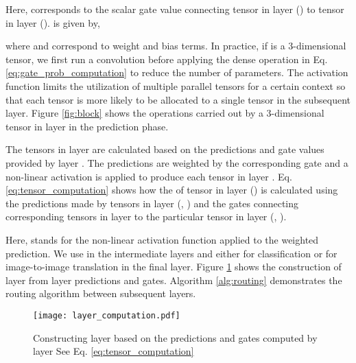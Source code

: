 \documentclass[10pt,twocolumn,letterpaper]{article}
\begin{document}
Here,  corresponds to the scalar gate value connecting  tensor in  layer () to   tensor in layer  ().  is given by,
\vspace{-0.1in}


where  and  correspond to weight and bias terms.
In practice, if  is a 3-dimensional tensor, we first run a  convolution before applying the dense operation in Eq. \ref{eq:gate_prob_computation} to reduce the number of parameters. The activation function  limits the utilization of multiple parallel tensors for a certain context so that each tensor is more likely to be allocated to a single tensor in the subsequent layer. Figure \ref{fig:block} shows the operations carried out by a 3-dimensional tensor in layer  in the prediction phase.




The tensors in layer  are calculated based on the predictions and gate values provided by layer . The predictions are weighted by the corresponding gate and a non-linear activation is applied to produce each tensor in layer .
Eq. \ref{eq:tensor_computation} shows how the of tensor  in layer  () is calculated using the predictions made by tensors in layer  (, ) and the gates connecting corresponding tensors in layer  to the particular tensor in layer  (, ).
\vspace{-0.1in}


Here,  stands for the non-linear activation function applied to the weighted prediction. We use  in the intermediate layers and either  for classification or  for image-to-image translation in the final layer. Figure \ref{fig:routing} shows the construction of layer  from layer  predictions and gates.
Algorithm \ref{alg:routing} demonstrates the routing algorithm between subsequent layers.



\begin{figure}[t]
	\begin{center}
		\texttt{[image: layer\_computation.pdf]}
	\end{center}
	\vspace{-0.2in}
	\caption{Constructing layer  based on the predictions and gates computed by layer  See Eq. \ref{eq:tensor_computation}}
	\label{fig:routing}
	\vspace{-0.1in}
\end{figure}
\end{document}
